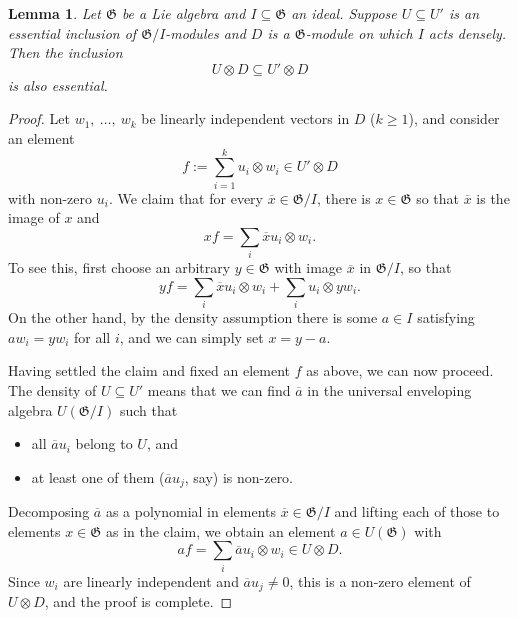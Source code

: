 \documentclass[11pt]{article}
\theoremstyle{plain}
\newtheorem{lemma}{Lemma}[section]
\theoremstyle{nonumberplain}
\theoremstyle{plain}
\numberwithin{equation}{section}
\theoremstyle{nonumberplain}
\newtheorem{proof}{Proof}
\newcommand\bK{{\mathbb K}}
\newcommand\fG{{\mathfrak G}}
\newcommand\1{{\bf 1}}
\DeclareMathOperator{\End}{\mathrm{End}}
\begin{document}
\begin{lemma}\label{le.tens-dense}
  Let $\fG$ be a Lie algebra and $I\subseteq \fG$ an ideal. Suppose $U\subseteq U'$ is an essential inclusion of $\fG/I$-modules and $D$ is a $\fG$-module on which $I$ acts densely. %
  Then the inclusion
  \begin{equation*}
    U\otimes D\subseteq U'\otimes D
  \end{equation*}
  is also essential.
\end{lemma}
\begin{proof}
  Let $w_1,~\ldots,~w_k$ be linearly independent vectors in $D$ ($k \ge 1$), and consider an element
  \begin{equation*}
    f:=\sum_{i=1}^k u_i\otimes w_i\in U'\otimes D
  \end{equation*}
  with non-zero $u_i$. We claim that for every $\overline{x}\in \fG/I$, there is $x\in \fG$ so that $\overline{x}$ is the image of $x$ and $$x f=\sum_i \overline{x}u_i\otimes w_i.$$
  To see this, first choose an arbitrary $y\in \fG$ with image $\overline{x}$ in $\fG/${$I$}, so that
  \begin{equation*}
    y f = \sum_i \overline{x}u_i\otimes w_i + \sum_i u_i\otimes yw_i.
  \end{equation*}
  On the other hand, by the density assumption there is some $a\in I$ satisfying $aw_i=yw_i$ for all $i$, and we can simply set $x=y-a$.

  Having settled the claim and fixed an element $f$ as above, we can now proceed. The density of $U\subseteq U'$ means that we can find $\overline{a}$ in the universal enveloping algebra $U(\fG/I)$ such that
  \begin{itemize}
  \item[$-$] all $\overline{a}u_i$ belong to $U$, and
  \item[$-$] at least one of them ($\overline{a}u_j$, say) is non-zero.
  \end{itemize}
  Decomposing $\overline{a}$ as a polynomial in elements $\overline{x}\in \fG/I$ and lifting each of those to elements $x\in \fG$ as in the claim, we obtain an element $a\in U(\fG)$ with
  \begin{equation*}
    a f = \sum_i \overline{a}u_i\otimes w_i\in U\otimes D. 
  \end{equation*}
  Since $w_i$ are linearly independent and $\overline{a}u_j\ne 0$, this is a non-zero element of $U\otimes D$, and the proof is complete.
\end{proof}
\end{document}
